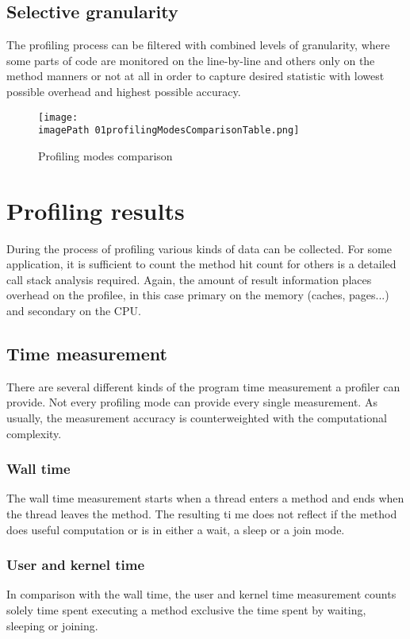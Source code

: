 \subsection{Selective granularity}
The profiling process can be filtered with combined levels of granularity, where some parts of code are monitored on the line-by-line and others only on the method manners or not at all in order to capture desired statistic with lowest possible overhead and highest possible accuracy.

\begin{figure}
	\centering
		\texttt{[image: \\imagePath 01profilingModesComparisonTable.png]}
		\caption{Profiling modes comparison}
	\label{fig:01profilingModesComparisonTable}
\end{figure}


\section{Profiling results}
During the process of profiling various kinds of data can be collected. For some application, it is sufficient to count the method hit count for others is a detailed call stack analysis required. Again, the amount of result information places overhead on the profilee, in this case primary on the memory (caches, pages...) and secondary on the CPU.

\subsection{Time measurement}
There are several different kinds of the program time measurement a profiler can provide. Not every profiling mode can provide every single measurement. As usually, the measurement accuracy is counterweighted with the computational complexity.

\subsubsection*{Wall time}
The wall time measurement starts when a thread enters a method and ends when the thread leaves the method. The resulting ti	me does not reflect if the method does useful computation or is in either a wait, a sleep or a join mode.

\subsubsection*{User and kernel time}
In comparison with the wall time, the user and kernel time measurement counts solely time spent executing a method exclusive the time spent by waiting, sleeping or joining.

